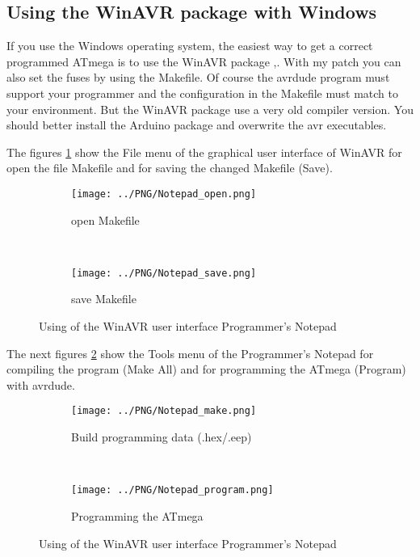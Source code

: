 \subsection{Using the WinAVR package with Windows}
If you use the Windows operating system, the easiest way to get a correct programmed
ATmega is to use the WinAVR package \cite{winavr1},\cite{winavr2}.
With my patch \cite{winavr3} you can also set the fuses by using the Makefile.
Of course the avrdude program must support your programmer and the configuration
in the Makefile must match to your environment.
But the WinAVR package use a very old compiler version. You should better install
the Arduino package and overwrite the avr executables.

The figures \ref{fig:WinAVR1} show the File menu of the graphical user interface of WinAVR for
open the file Makefile and for saving the changed Makefile (Save).

\begin{figure}[H]
  \begin{subfigure}[b]{.5\textwidth}
    \centering
    \texttt{[image: ../PNG/Notepad\_open.png]}
    \caption{open Makefile}
  \end{subfigure}
  ~
  \begin{subfigure}[b]{.5\textwidth}
    \centering
    \texttt{[image: ../PNG/Notepad\_save.png]}
    \caption{save Makefile}
  \end{subfigure}
  \caption{Using of the WinAVR user interface Programmer's Notepad}
  \label{fig:WinAVR1}
\end{figure}

The next figures \ref{fig:WinAVR2} show the Tools menu of the Programmer's Notepad
for compiling the program (Make All) and for programming the ATmega (Program) with avrdude.

\begin{figure}[H]
  \begin{subfigure}[b]{.5\textwidth}
    \centering
    \texttt{[image: ../PNG/Notepad\_make.png]}
    \caption{Build programming data (.hex/.eep)}
  \end{subfigure}
  ~
  \begin{subfigure}[b]{.5\textwidth}
    \centering
    \texttt{[image: ../PNG/Notepad\_program.png]}
    \caption{Programming the ATmega}
  \end{subfigure}
  \caption{Using of the WinAVR user interface Programmer's Notepad}
  \label{fig:WinAVR2}
\end{figure}



